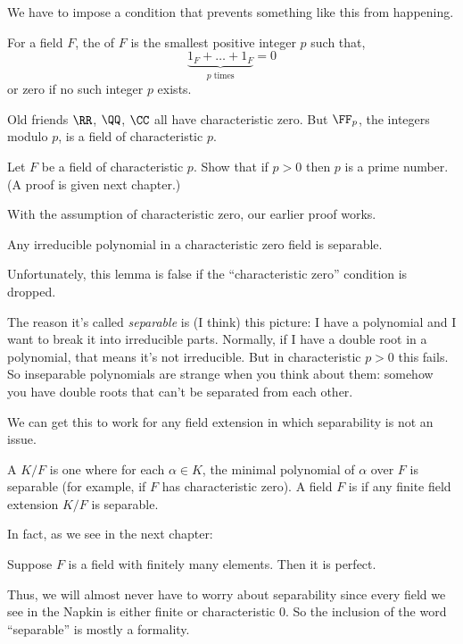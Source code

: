We have to impose a condition that prevents something like this from happening.
\begin{definition}
	For a field $F$, the  of $F$ is the smallest
	positive integer $p$ such that,
	\[ \underbrace{1_F + \dots + 1_F}_{\text{$p$ times}} = 0 \]
	or zero if no such integer $p$ exists.
\end{definition}
\begin{example}
	Old friends $\RR$, $\QQ$, $\CC$ all have characteristic zero.
	But $\FF_p$, the integers modulo $p$, is a field of characteristic $p$.
\end{example}
\begin{exercise}
	Let $F$ be a field of characteristic $p$.
	Show that if $p > 0$ then $p$ is a prime number.
	(A proof is given next chapter.)
\end{exercise}
With the assumption of characteristic zero, our earlier proof works.
\begin{lemma}
	Any irreducible polynomial in a characteristic zero field is separable.
\end{lemma}
Unfortunately, this lemma is false if the ``characteristic zero'' condition is dropped.

\begin{remark}
	The reason it's called \emph{separable} is (I think) this picture:
	I have a polynomial and I want to break it into irreducible parts.
	Normally, if I have a double root in a polynomial, that means it's not irreducible.
	But in characteristic $p > 0$ this fails.
	So inseparable polynomials are strange when you think about them: somehow
	you have double roots that can't be separated from each other.
\end{remark}

We can get this to work for any field extension in which separability is not an issue.
\begin{definition}
	A  $K/F$ is one where for each $\alpha \in K$,
	the minimal polynomial of $\alpha$ over $F$ is separable
	(for example, if $F$ has characteristic zero).
	A field $F$ is  if any finite field extension $K/F$ is separable.
\end{definition}
In fact, as we see in the next chapter:
\begin{theorem}
	Suppose $F$ is a field with finitely many elements. Then it is perfect.
\end{theorem}
Thus, we will almost never have to worry about separability
since every field we see in the Napkin is either finite or characteristic $0$.
So the inclusion of the word ``separable'' is mostly a formality.

